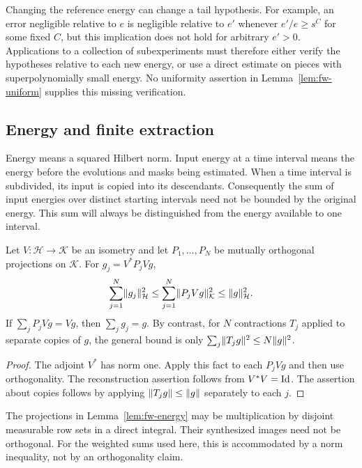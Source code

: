 \begin{remark}\label{rem:fw-small-pieces}
Changing the reference energy can change a tail hypothesis.  For
example, an error negligible relative to $e$ is negligible relative to
$e'$ whenever $e'/e\ge s^C$ for some fixed $C$, but this implication
does not hold for arbitrary $e'>0$.  Applications to a collection of
subexperiments must therefore either verify the hypotheses relative
to each new energy, or use a direct estimate on pieces with
superpolynomially small energy.  No uniformity assertion in
Lemma~\ref{lem:fw-uniform} supplies this missing verification.
\end{remark}

\subsection{Energy and finite extraction}

Energy means a squared Hilbert norm.  Input energy at a time interval
means the energy before the evolutions and masks being estimated.
When a time interval is subdivided, its input is copied into its
descendants.  Consequently the sum of input energies over distinct
starting intervals need not be bounded by the original energy.
This sum will always be distinguished from the energy available to
one interval.

\begin{lemma}
\label{lem:fw-energy}
Let $V:\mathcal H\to\mathcal K$ be an isometry and let $P_1,\ldots,P_N$
be mutually orthogonal projections on $\mathcal K$.  For
$g_j=V^*P_jVg$,
\begin{equation}\label{eq:fw-row-energy}
 \sum_{j=1}^N\lVert g_j\rVert_{\mathcal H}^2
 \le\sum_{j=1}^N\lVert P_jVg\rVert_{\mathcal K}^2
 \le\lVert g\rVert_{\mathcal H}^2.
\end{equation}
If $\sum_jP_jVg=Vg$, then $\sum_jg_j=g$.
By contrast, for $N$ contractions $T_j$ applied to separate copies of
$g$, the general bound is only
$\sum_j\lVert T_jg\rVert^2\le N\lVert g\rVert^2$.
\end{lemma}

\begin{proof}
The adjoint $V^*$ has norm one.  Apply this fact to each $P_jVg$ and
then use orthogonality.  The reconstruction assertion follows from
$V^*V=\mathrm{Id}$.  The assertion about copies follows by applying
$\lVert T_jg\rVert\le\lVert g\rVert$ separately to each $j$.
\end{proof}

The projections in Lemma~\ref{lem:fw-energy} may be multiplication by
disjoint measurable row sets in a direct integral.  Their synthesized
images need not be orthogonal.  For the weighted sums used here, this
is accommodated by a norm inequality, not by an orthogonality claim.

